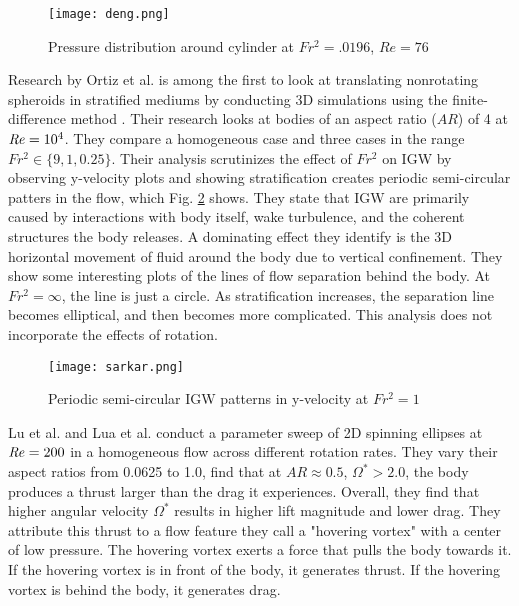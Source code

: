 \begin{figure}[htbp]
\centering
\texttt{[image: deng.png]}
\caption{Pressure distribution around cylinder at $Fr^2 = .0196$, $Re = 76$ \cite{deng_drag_2022}}
\label{fig:deng}
\end{figure}

Research by Ortiz et al. \cite{ortiz-tarin_stratified_2019} is among the first to look at translating nonrotating spheroids in stratified mediums by conducting 3D simulations using the finite-difference method . Their research looks at bodies of an aspect ratio ($AR$) of 4 at $\mathit{Re} = 10^4$. They compare a homogeneous case and three cases in the range $Fr^2 \in \{9, 1, 0.25\}$. Their analysis scrutinizes the effect of $Fr^2$ on IGW by observing y-velocity plots and showing stratification creates periodic semi-circular patters in the flow, which Fig. \ref{fig:sarkar} shows. They state that IGW are primarily caused by interactions with body itself, wake turbulence, and the coherent structures the body releases. A dominating effect they identify is the 3D horizontal movement of fluid around the body due to vertical confinement. They show some interesting plots of the lines of flow separation behind the body. At $Fr^2 = \infty$, the line is just a circle. As stratification increases, the separation line becomes elliptical, and then becomes more complicated. This analysis does not incorporate the effects of rotation.

\begin{figure}[htbp]
\centering
\texttt{[image: sarkar.png]}
\caption{Periodic semi-circular IGW patterns in y-velocity at $Fr^2 = 1$ \cite{ortiz-tarin_stratified_2019}}
\label{fig:sarkar}
\end{figure}

Lu et al. \cite{lu_flow_2018} and Lua et al. \cite{lua_rotating_2018} conduct a parameter sweep of 2D spinning ellipses at $\mathit{Re} = 200$ in a homogeneous flow across different rotation rates. They vary their aspect ratios from 0.0625 to 1.0, find that at $AR \approx 0.5$, $\Omega^{\ast} > 2.0$, the body produces a thrust larger than the drag it experiences. Overall, they find that higher angular velocity $\Omega^{\ast}$ results in higher lift magnitude and lower drag. They attribute this thrust to a flow feature they call a "hovering vortex" with a center of low pressure. The hovering vortex exerts a force that pulls the body towards it. If the hovering vortex is in front of the body, it generates thrust. If the hovering vortex is behind the body, it generates drag.  

